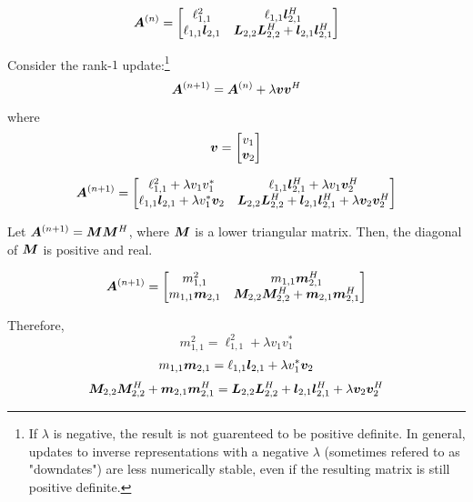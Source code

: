 \begin{appendices}
\begin{equation}
\bm{A}^{(n)} = \begin{bmatrix} \ell_{1,1}^2 & \ell_{1,1}\bm{l}_{2,1}^H \\ \ell_{1,1}\bm{l}_{2,1} & \bm{L}_{2,2}\bm{L}_{2,2}^H + \bm{l}_{2,1}\bm{l}_{2,1}^H \end{bmatrix}
\end{equation}

Consider the rank-$1$ update:\footnote{If $\lambda$ is negative, the result is not guarenteed to be positive definite. In general, updates to inverse representations with a negative $\lambda$ (sometimes refered to as "downdates") are less numerically stable, even if the resulting matrix is still positive definite.}
\begin{equation}
\bm{A}^{(n + 1)} = \bm{A}^{(n)} + \lambda\bm{v}\bm{v}^H
\end{equation}

where
\begin{equation}
\bm{v} = \begin{bmatrix} v_1 \\ \bm{v}_2 \end{bmatrix}
\end{equation}

\begin{equation}
\bm{A}^{(n + 1)} = \begin{bmatrix} \ell_{1,1}^2 + \lambda v_1 v_1^{*} & \ell_{1,1}\bm{l}_{2,1}^H + \lambda v_1\bm{v}_2^H \\ \ell_{1,1}\bm{l}_{2,1} + \lambda v_1^{*}\bm{v}_2 & \bm{L}_{2,2}\bm{L}_{2,2}^H + \bm{l}_{2,1}\bm{l}_{2,1}^H + \lambda\bm{v}_2\bm{v}_2^H \end{bmatrix}
\end{equation}

Let $\bm{A}^{(n + 1)} = \bm{M}\bm{M}^H$, where $\bm{M}$ is a lower triangular matrix. Then, the diagonal of $\bm{M}$ is positive and real.

\begin{equation}
\bm{A}^{(n + 1)} = \begin{bmatrix} m_{1,1}^2 & m_{1,1}\bm{m}_{2,1}^H \\ m_{1,1}\bm{m}_{2,1} & \bm{M}_{2,2}\bm{M}_{2,2}^H + \bm{m}_{2,1}\bm{m}_{2,1}^H \end{bmatrix}
\end{equation}

Therefore,
\begin{equation}
m_{1,1}^2 = \ell_{1,1}^2 + \lambda v_1 v_1^{*}
\end{equation}
\begin{equation}
m_{1,1}\bm{m}_{2,1} = \ell_{1,1}\bm{l}_{2,1} + \lambda v_1^{*}\bm{v}_2
\end{equation}
\begin{equation}
\bm{M}_{2,2}\bm{M}_{2,2}^H + \bm{m}_{2,1}\bm{m}_{2,1}^H = \bm{L}_{2,2}\bm{L}_{2,2}^H + \bm{l}_{2,1}\bm{l}_{2,1}^H + \lambda\bm{v}_2\bm{v}_2^H
\end{equation}


\end{appendices}
